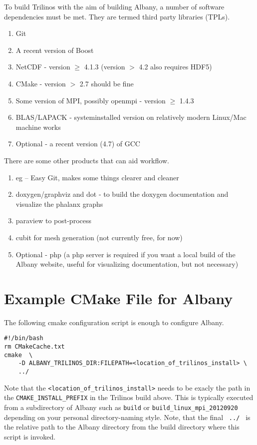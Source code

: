 \documentclass[pdf,12pt,report,strict]{SANDreport}
\theoremstyle{remark}
\begin{document}
To build Trilinos with the aim of building Albany, a number of
software dependencies must be met. They are termed third party
libraries (TPLs). 
\begin{enumerate}
\item Git
\item A recent version of Boost
\item NetCDF - version $\ge$ 4.1.3 (version $>$ 4.2 also requires
  HDF5)
\item CMake - version $>$ 2.7 should be fine
\item Some version of MPI, possibly openmpi - version $\ge$ 1.4.3
\item BLAS/LAPACK - systeminstalled version on relatively modern
  Linux/Mac machine works
\item Optional - a recent version (4.7) of GCC
\end{enumerate}
There are some other products that can aid workflow.
\begin{enumerate}
\item eg -- Easy Git, makes some things clearer and cleaner
\item doxygen/graphviz and dot - to build the doxygen documentation
  and visualize the phalanx graphs
\item paraview to post-process
\item cubit for mesh generation (not currently free, for now)
\item Optional - php (a php server is required if you want a local
  build of the Albany website, useful for visualizing documentation,
  but not necessary)
\end{enumerate}

\section{Example CMake File for Albany}
The following cmake configuration script is enough to configure Albany.
\begin{verbatim}
#!/bin/bash
rm CMakeCache.txt
cmake  \
    -D ALBANY_TRILINOS_DIR:FILEPATH=<location_of_trilinos_install> \
    ../
\end{verbatim}
Note that the \texttt{<location\_of\_trilinos\_install>} needs to be
exacly the path in the \texttt{CMAKE\_INSTALL\_PREFIX} in the Trilinos
build above.  This is typically executed from a subdirectory of Albany such as
\texttt{build} or \texttt{build\_linux\_mpi\_20120920} depending on
your personal directory-naming style.
Note, that the final \texttt{   ../  } is the relative path to the Albany
directory from the build directory where this script is invoked.
\end{document}
